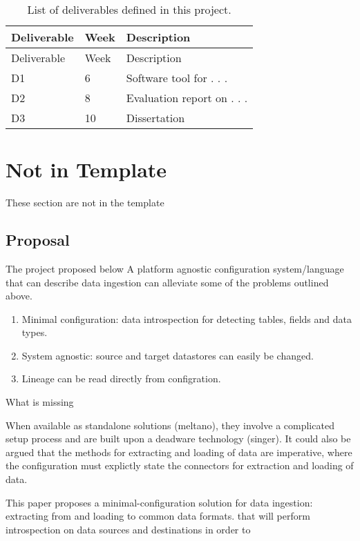 \begin{longtable}[]{@{}lll@{}}
\caption{List of deliverables defined in this project.}\tabularnewline
\toprule\noalign{}
Deliverable & Week & Description \\
\midrule\noalign{}
\endfirsthead
\toprule\noalign{}
Deliverable & Week & Description \\
\midrule\noalign{}
\endhead
\bottomrule\noalign{}
\endlastfoot
D1 & 6 & Software tool for . . . \\
D2 & 8 & Evaluation report on . . . \\
D3 & 10 & Dissertation \\
\end{longtable}

\section{Not in Template}\label{not-in-template}

These section are not in the template

\subsection{Proposal}\label{proposal}

The project proposed below A platform agnostic configuration
system/language that can describe data ingestion can alleviate some of
the problems outlined above.

\begin{enumerate}
\def\labelenumi{\arabic{enumi}.}
\tightlist
\item
  Minimal configuration: data introspection for detecting tables, fields
  and data types.
\item
  System agnostic: source and target datastores can easily be changed.
\item
  Lineage can be read directly from configration.
\end{enumerate}

What is missing

When available as standalone solutions (meltano), they involve a
complicated setup process and are built upon a deadware technology
(singer). It could also be argued that the methods for extracting and
loading of data are imperative, where the configuration must explictly
state the connectors for extraction and loading of data.

This paper proposes a minimal-configuration solution for data ingestion:
extracting from and loading to common data formats. that will perform
introspection on data sources and destinations in order to

